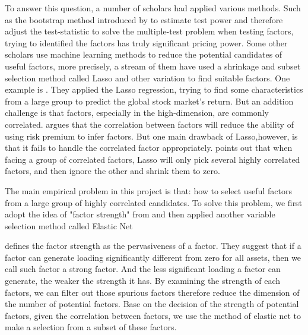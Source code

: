 \documentclass[12pt]{article}
\begin{document}
To answer this question, a number of scholars had applied various methods. 
Such as the bootstrap method introduced by \cite{Harvey2017} to estimate test power and therefore adjust the test-statistic to solve the multiple-test problem when testing factors, trying to identified the factors has truly significant pricing power.
Some other scholars use machine learning methods to reduce the potential candidates of useful factors, more precisely, a stream of them have used a shrinkage and subset selection method called Lasso \cite{Tibshirani1996} and other variation to find suitable factors.
One example is .
They applied the Lasso regression, trying to find some characteristics from a large group to predict the global stock market's return.
But an addition challenge is that factors, especially in the high-dimension, are commonly correlated.
 argues that the correlation between factors will reduce the ability of using risk premium to infer factors.
But one main drawback of Lasso,however, is that it fails to handle the correlated factor appropriately.
 points out that when facing a group of correlated factors, Lasso will only pick several highly correlated factors, and then ignore the other and shrink them to zero. 

The main empirical problem in this project is that: how to select useful factors from a large group of  highly correlated candidates.
To solve this problem, we first adopt the idea of "factor strength" from  and then applied another variable selection method called Elastic Net \cite{Zou2005}

 defines the factor strength as the pervasiveness of a factor. 
They suggest that if a factor can generate loading significantly different from zero for all assets, then we call such factor a strong factor.
And the less significant loading a factor can generate, the weaker the strength it has.
By examining the strength of each factors, we can filter out those spurious factors therefore reduce the dimension of the number of potential factors.
Base on the decision of the strength of potential factors, given the correlation between factors, we use the method of elastic net to make a selection from a subset of these factors.
\end{document}
